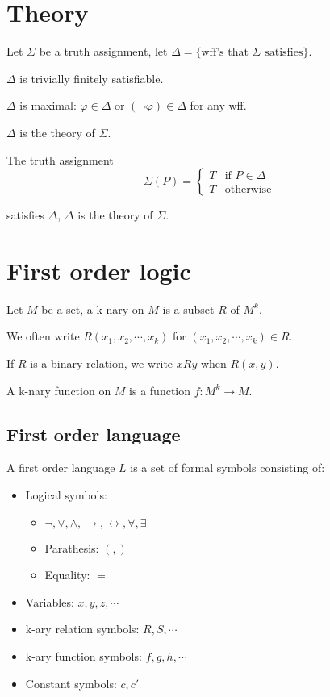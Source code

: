 \documentclass[11pt]{article}
\begin{document}
	\section{Theory}
	Let $\Sigma$ be a truth assignment, let $\Delta = \{\text{wff's that $\Sigma$ satisfies}\}$.
	
	$\Delta$ is trivially finitely satisfiable.
	
	$\Delta$ is maximal: $\varphi \in \Delta$ or $(\neg \varphi) \in \Delta$ for any wff.
	
	$\Delta$ is the theory of $\Sigma$.
	
	The truth assignment
	\[\Sigma(P) = 
	\begin{cases}
		T & \text{if } P \in \Delta\\
		T & \text{otherwise}
	\end{cases} \]
	
	satisfies $\Delta$, $\Delta$ is the theory of $\Sigma$.
	
	\section{First order logic}
	
	Let $M$ be a set, a k-nary on $M$ is a subset $R$ of $M^k$.
	
	We often write $R(x_1, x_2, \cdots, x_k)$ for $(x_1, x_2, \cdots, x_k) \in R$.
	
	If $R$ is a binary relation, we write $xRy$ when $R(x, y)$.
	
	A k-nary function on $M$ is a function $f: M^k \rightarrow M$.
	
	\subsection{First order language}
	
	A first order language $L$ is a set of formal symbols consisting of:
	\begin{itemize}
		\item Logical symbols: 
		\begin{itemize} 
			\item $\neg, \vee, \wedge, \rightarrow, \leftrightarrow, \forall, \exists$
			\item Parathesis: $(, )$
			\item Equality: $=$
		\end{itemize}
		\item Variables: $x, y, z,\cdots$
		\item k-ary relation symbols: $R, S, \cdots$
		\item k-ary function symbols: $f, g, h, \cdots$
		\item Constant symbols: $c, c'$
	\end{itemize}
	
\end{document}
